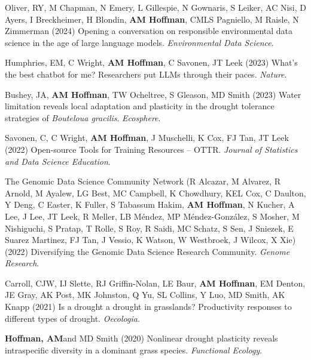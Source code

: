 \documentclass{cv}
\begin{document}
\begin{pubenum}
\item Oliver, RY, M Chapman, N Emery, L Gillespie, N Gownaris, S Leiker, AC Nisi, D Ayers, I Breckheimer, H Blondin, \textbf{AM Hoffman}, CMLS Pagniello, M Raisle, N Zimmerman (2024) Opening a conversation on responsible environmental data science in the age of large language models. \textit{Environmental Data Science}. 

\item Humphries, EM, C Wright, \textbf{AM Hoffman}, C Savonen, JT Leek (2023) What's the best chatbot for me? Researchers put LLMs through their paces. \textit{Nature}. 

\item Bushey, JA, \textbf{AM Hoffman}, TW Ocheltree, S Gleason, MD Smith (2023) Water limitation reveals local adaptation and plasticity in the drought tolerance strategies of \textit{Bouteloua gracilis}. \textit{Ecosphere}. 

\item Savonen, C, C Wright, \textbf{AM Hoffman}, J Muschelli, K Cox, FJ Tan, JT Leek (2022) Open-source Tools for Training Resources -- OTTR. \textit{Journal of Statistics and Data Science Education}. 

\item The Genomic Data Science Community Network (R Alcazar, M Alvarez, R Arnold, M Ayalew, LG Best, MC Campbell, K Chowdhury, KEL Cox, C Daulton, Y Deng, C Easter, K Fuller, S Tabassum Hakim, \textbf{AM Hoffman}\footnotemark[1], N Kucher, A Lee, J Lee, JT Leek, R Meller, LB Méndez, MP Méndez-González, S Mosher, M Nishiguchi, S Pratap, T Rolle, S Roy, R Saidi, MC Schatz, S Sen, J Sniezek, E Suarez Martinez, FJ Tan, J Vessio, K Watson, W Westbroek, J Wilcox, X Xie) (2022) Diversifying the Genomic Data Science Research Community. \textit{Genome Research}. 

\item Carroll, CJW, IJ Slette, RJ Griffin-Nolan, LE Baur, \textbf{AM Hoffman}, EM Denton, JE Gray, AK Post, MK Johnston, Q Yu, SL Collins, Y Luo, MD Smith, AK Knapp (2021) Is a drought a drought in grasslands? Productivity responses to different types of drought. \textit{Oecologia}. 

\item\textbf{Hoffman, AM}\footnotemark[1] and MD Smith (2020) Nonlinear drought plasticity reveals intraspecific diversity in a dominant grass species. \textit{Functional Ecology}. \footnotemark[\value{footnote}]


\end{pubenum}
\end{document}
